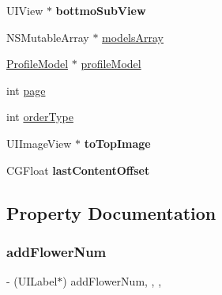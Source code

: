 \begin{DoxyCompactItemize}
\item 
\mbox{\label{category_my_share_order_view_controller_07_08_a76b0b3fe8c8f387dea32b8555d3e92de}} 
U\+I\+View $\ast$ {\bfseries bottmo\+Sub\+View}
\item 
N\+S\+Mutable\+Array $\ast$ \mbox{\hyperlink{category_my_share_order_view_controller_07_08_a44b2a62ad7fb568fc5562ea4d2463ce2}{models\+Array}}
\item 
\mbox{\hyperlink{interface_profile_model}{Profile\+Model}} $\ast$ \mbox{\hyperlink{category_my_share_order_view_controller_07_08_a83482f29002850d1cb8079deb9557c51}{profile\+Model}}
\item 
int \mbox{\hyperlink{category_my_share_order_view_controller_07_08_ad06a50d0dbfdb39a8ef7b90ffacba3ae}{page}}
\item 
int \mbox{\hyperlink{category_my_share_order_view_controller_07_08_a4139a53e944a94bd0542cf886128b42d}{order\+Type}}
\item 
\mbox{\label{category_my_share_order_view_controller_07_08_ad673415d5a1e01dacf0218a14eeeb564}} 
U\+I\+Image\+View $\ast$ {\bfseries to\+Top\+Image}
\item 
\mbox{\label{category_my_share_order_view_controller_07_08_a916a5fc11deeb4d1730ce481a3a79da2}} 
C\+G\+Float {\bfseries last\+Content\+Offset}
\end{DoxyCompactItemize}


\subsection{Property Documentation}
\mbox{\label{category_my_share_order_view_controller_07_08_a1466a6b55186a9fcfdecc9ac38f5e1ac}} 
\subsubsection{\texorpdfstring{add\+Flower\+Num}{addFlowerNum}}
{\footnotesize\ttfamily -\/ (U\+I\+Label$\ast$) add\+Flower\+Num\hspace{0.3cm}{\ttfamily [read]}, {\ttfamily [write]}, {\ttfamily [nonatomic]}, {\ttfamily [strong]}}

